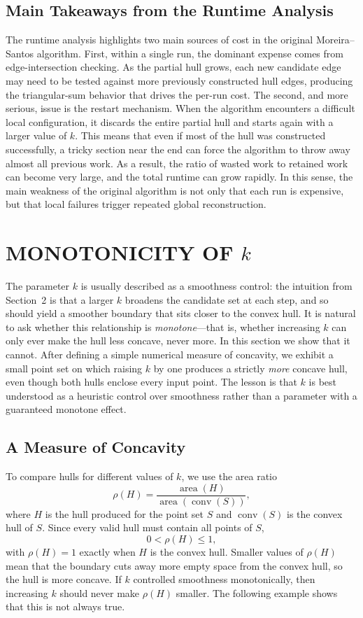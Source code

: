 \documentclass[a4paper,twoside]{article}
\begin{document}
\subsection{Main Takeaways from the Runtime Analysis}
The runtime analysis highlights two main sources of cost in the original Moreira--Santos algorithm. First, within a single run, the dominant expense comes from edge-intersection checking. As the partial hull grows, each new candidate edge may need to be tested against more previously constructed hull edges, producing the triangular-sum behavior that drives the per-run cost.
The second, and more serious, issue is the restart mechanism. When the algorithm encounters a difficult local configuration, it discards the entire partial hull and starts again with a larger value of $k$. This means that even if most of the hull was constructed successfully, a tricky section near the end can force the algorithm to throw away almost all previous work. As a result, the ratio of wasted work to retained work can become very large, and the total runtime can grow rapidly. In this sense, the main weakness of the original algorithm is not only that each run is expensive, but that local failures trigger repeated global reconstruction.
\section{\uppercase{Monotonicity of $k$}}
The parameter $k$ is usually described as a smoothness control: the intuition from Section~2 is that a larger $k$ broadens the candidate set at each step, and so should yield a smoother boundary that sits closer to the convex hull. It is natural to ask whether this relationship is \emph{monotone}---that is, whether increasing $k$ can only ever make the hull less concave, never more. In this section we show that it cannot. After defining a simple numerical measure of concavity, we exhibit a small point set on which raising $k$ by one produces a strictly \emph{more} concave hull, even though both hulls enclose every input point. The lesson is that $k$ is best understood as a heuristic control over smoothness rather than a parameter with a guaranteed monotone effect.


\subsection{A Measure of Concavity}
To compare hulls for different values of \(k\), we use the area ratio
\[
  \rho(H) = \frac{\operatorname{area}(H)}{\operatorname{area}(\operatorname{conv}(S))},
\]
where \(H\) is the hull produced for the point set \(S\) and \(\operatorname{conv}(S)\) is the convex hull of \(S\). Since every valid hull must contain all points of \(S\),
\[
  0 < \rho(H) \leq 1,
\]
with \(\rho(H) = 1\) exactly when \(H\) is the convex hull. Smaller values of \(\rho(H)\) mean that the boundary cuts away more empty space from the convex hull, so the hull is more concave. If $k$ controlled smoothness monotonically, then increasing $k$ should never make \(\rho(H)\) smaller. The following example shows that this is not always true.
\end{document}
